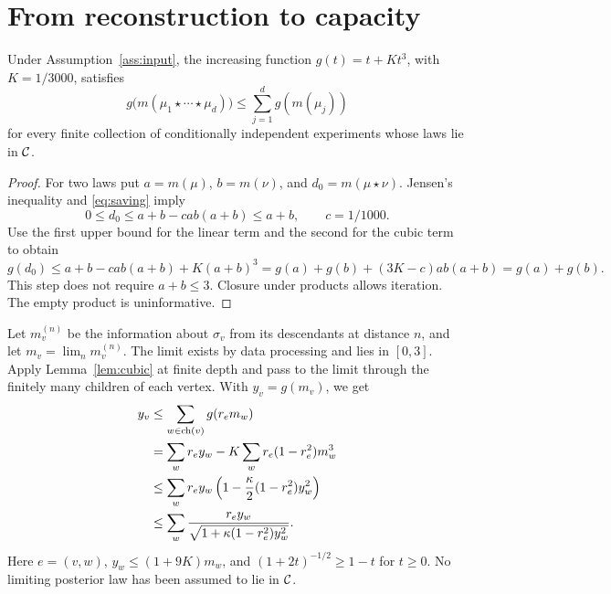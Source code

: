 \section{From reconstruction to capacity}\label{sec:necessity}

\begin{lemma}\label{lem:cubic}
Under Assumption~\ref{ass:input}, the increasing function
$g(t)=t+Kt^3$, with $K=1/3000$, satisfies
\begin{equation}\label{eq:cubic}
 g\bigl(m(\mu_1\star\cdots\star\mu_d)\bigr)
       \leq\sum_{j=1}^d g(m(\mu_j))
\end{equation}
for every finite collection of conditionally independent experiments
whose laws lie in $\mathcal C$.
\end{lemma}
\begin{proof}
For two laws put $a=m(\mu)$, $b=m(\nu)$, and
$d_0=m(\mu\star\nu)$. Jensen's inequality and
\eqref{eq:saving} imply
\[
 0\leq d_0\leq a+b-cab(a+b)\leq a+b,\qquad c=1/1000.
\]
Use the first upper bound for the linear term and the second for
the cubic term to obtain
\[
 g(d_0)\leq a+b-cab(a+b)+K(a+b)^3
 =g(a)+g(b)+(3K-c)ab(a+b)=g(a)+g(b).
\]
This step does not require $a+b\leq3$. Closure under products
allows iteration. The empty product is uninformative.
\end{proof}

Let $m_v^{(n)}$ be the information about $\sigma_v$ from its
descendants at distance $n$, and let $m_v=\lim_n m_v^{(n)}$.
The limit exists by data processing and lies in $[0,3]$.
Apply Lemma~\ref{lem:cubic} at finite depth and pass to the limit
through the finitely many children of each vertex. With $y_v=g(m_v)$,
we get
\begin{align}
 y_v&\leq\sum_{w\in\operatorname{ch}(v)}g(r_e m_w)\notag\\
 &=\sum_w r_e y_w-K\sum_w r_e(1-r_e^2)m_w^3\notag\\
 &\leq\sum_w r_e y_w
       \left(1-\frac\kappa2(1-r_e^2)y_w^2\right)\notag\\
 &\leq\sum_w\frac{r_e y_w}
                 {\sqrt{1+\kappa(1-r_e^2)y_w^2}}.
                 \label{eq:recursive-labels}
\end{align}
Here $e=(v,w)$, $y_w\leq(1+9K)m_w$, and
$(1+2t)^{-1/2}\geq1-t$ for $t\geq0$. No limiting posterior law
has been assumed to lie in $\mathcal C$.

